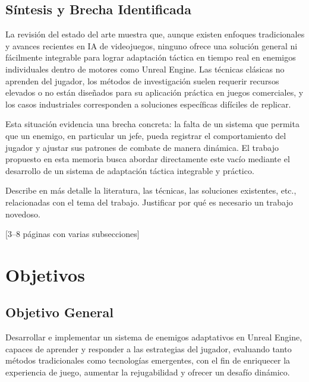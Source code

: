 \documentclass[informe]{upropuesta}
\begin{document}
\subsection{Síntesis y Brecha Identificada}

La revisión del estado del arte muestra que, aunque existen enfoques tradicionales y avances recientes en IA de videojuegos, ninguno ofrece una solución general ni fácilmente integrable para lograr adaptación táctica en tiempo real en enemigos individuales dentro de motores como Unreal Engine. Las técnicas clásicas no aprenden del jugador, los métodos de investigación suelen requerir recursos elevados o no están diseñados para su aplicación práctica en juegos comerciales, y los casos industriales corresponden a soluciones específicas difíciles de replicar.

Esta situación evidencia una brecha concreta: la falta de un sistema que permita que un enemigo, en particular un jefe, pueda registrar el comportamiento del jugador y ajustar sus patrones de combate de manera dinámica. El trabajo propuesto en esta memoria busca abordar directamente este vacío mediante el desarrollo de un sistema de adaptación táctica integrable y práctico.




\begin{pauta}
Describe en más detalle la literatura, las técnicas, las soluciones existentes, etc., relacionadas con el tema del trabajo. Justificar por qué es necesario un trabajo novedoso.

[3--8 páginas con varias subsecciones]
\end{pauta}




\section{Objetivos}\label{chap:obj}

\subsection*{Objetivo General}
Desarrollar e implementar un sistema de enemigos adaptativos en Unreal Engine, capaces de aprender y responder a las estrategias del jugador, evaluando tanto métodos tradicionales como tecnologías emergentes, con el fin de enriquecer la experiencia de juego, aumentar la rejugabilidad y ofrecer un desafío dinámico.
\end{document}
